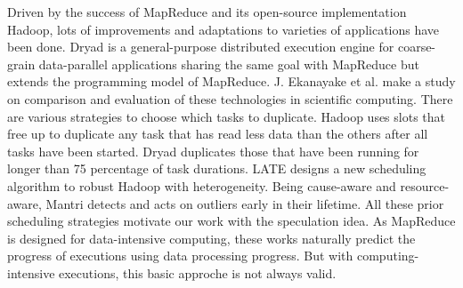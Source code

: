 Driven by the success of MapReduce \cite{dean} and its open-source implementation Hadoop,
lots of improvements \cite{Zaharia:2008:IMP:1855741.1855744}
\cite{Ananthanarayanan:2010:ROM:1924943.1924962} and adaptations
\cite{Srirama:2012:ASC:2304777.2304882} to varieties of applications have been done. Dryad
\cite{Isard:2007:DDD:1272998.1273005} is a general-purpose distributed execution engine
for coarse-grain data-parallel applications sharing the same goal with MapReduce but
extends the programming model of MapReduce. J. Ekanayake et al.
\cite{Ekanayake:2011:CTB:1990761.1990858} make a study on comparison and evaluation
of these technologies in scientific computing. There are various strategies to
choose which tasks to duplicate. Hadoop uses slots that free up to duplicate any task that
has read less data than the others after all tasks have been started. Dryad duplicates those
that have been running for longer than 75 percentage of task durations. LATE
\cite{Zaharia:2008:IMP:1855741.1855744} designs a new scheduling algorithm to robust
Hadoop with heterogeneity. Being cause-aware and resource-aware, Mantri
\cite{Ananthanarayanan:2010:ROM:1924943.1924962} detects and acts on outliers early in
their lifetime. All these prior scheduling strategies motivate our work with the
speculation idea. As MapReduce is designed for data-intensive computing, these works
naturally predict the progress of executions using data processing progress. But with
computing-intensive executions, this basic approche is not always valid.



